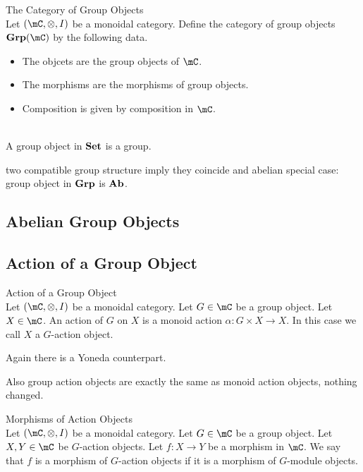 \documentclass[a4paper]{article}
\begin{document}
\begin{defn}{The Category of Group Objects}{}\\
Let $(\mC,\otimes,I)$ be a monoidal category. Define the category of group objects $\bold{Grp}(\mC)$ by the following data. 
\begin{itemize}
\item The objcets are the group objects of $\mC$. 
\item The morphisms are the morphisms of group objects. 
\item Composition is given by composition in $\mC$. 
\end{itemize}
\end{defn}

\begin{eg}{}{}\\
A group object in $\bold{Set}$ is a group. 
\end{eg}

two compatible group structure imply they coincide and abelian special case: group object in $\bold{Grp}$ is $\bold{Ab}$. 

\subsection{Abelian Group Objects}

\subsection{Action of a Group Object}
\begin{defn}{Action of a Group Object}{}\\
Let $(\mC,\otimes,I)$ be a monoidal category. Let $G\in\mC$ be a group object. Let $X\in\mC$. An action of $G$ on $X$ is a monoid action $\alpha:G\times X\to X$. In this case we call $X$ a $G$-action object. 
\end{defn}

Again there is a Yoneda counterpart. 

Also group action objects are exactly the same as monoid action objects, nothing changed. 

\begin{defn}{Morphisms of Action Objects}{}\\
Let $(\mC,\otimes,I)$ be a monoidal category. Let $G\in\mC$ be a group object. Let $X,Y\in\mC$ be $G$-action objects. Let $f:X\to Y$ be a morphism in $\mC$. We say that $f$ is a morphism of $G$-action objects if it is a morphism of $G$-module objects. 
\end{defn}
\end{document}
